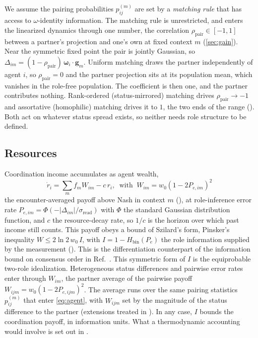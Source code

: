 \documentclass[
  aps,prx,
  reprint,
  superscriptaddress,
  nofootinbib,
  longbibliography
]{revtex4-2}
\newcommand{\w}{\bm{\omega}}
\newcommand{\g}{\mathbf{g}}
\newcommand{\rhopair}{\rho_{\mathrm{pair}}}
\newcommand{\sread}{\sigma_{\mathrm{read}}}
\newcommand{\smref}[1]{\cite[Sec.~#1]{SM}}
\newcommand{\smeq}[1]{\cite[Eq.~(#1)]{SM}}
\begin{document}
We assume the pairing probabilities $p^{(m)}_{ij}$ are set by a \emph{matching rule} that has access to $\omega$-identity information. The matching rule is unrestricted, and enters the linearized dynamics through one number, the correlation $\rhopair\in[-1,1]$ between a partner's projection and one's own at fixed context $m$ (\cref{sec:gain}). Near the symmetric fixed point the pair is jointly Gaussian, so $\Delta_{im}=(1-\rhopair)\,\w_i\cdot\g_m$. Uniform matching draws the partner independently of agent $i$, so $\rhopair=0$ and the partner projection sits at its population mean, which vanishes in the role-free population. The coefficient is then one, and the partner contributes nothing. Rank-ordered (status-mirrored) matching drives $\rhopair\to-1$ and assortative (homophilic) matching drives it to $1$, the two ends of the range (\smref{S2\,B}). Both act on whatever status spread exists, so neither needs role structure to be defined.

\subsection{Resources}
\noindent Coordination income accumulates as agent wealth,
\begin{equation}
\dot r_i = \sum_m f_m W_{im} - c\,r_i, \;\;\textrm{with} \;\;W_{im}=w_0(1-2P_{e,im})^2
\label{eq:resource}
\end{equation}
the encounter-averaged payoff above Nash in context $m$ (\smeq{S2}), at role-inference error rate $P_{e,im}=\Phi(-|\Delta_{im}|/\sread)$ with $\Phi$ the standard Gaussian distribution function, and $c$ the resource-decay rate, so $1/c$ is the horizon over which past income still counts. This payoff obeys a bound of Szilard's form, Pinsker's inequality $W\le 2\ln2\,w_0\,I$, with $I=1-H_{\mathrm{bin}}(P_e)$ the role information supplied by the measurement (\smref{S1}). This is the differentiation counterpart of the information bound on consensus order in Ref.~\cite{vansaders2023}. This symmetric form of $I$ is the equiprobable two-role idealization. Heterogeneous status differences and pairwise error rates enter through $W_{im}$, the partner average of the pairwise payoff $W_{ijm}=w_0(1-2P_{e,ijm})^2$. The average runs over the same pairing statistics $p^{(m)}_{ij}$ that enter \cref{eq:agent}, with $W_{ijm}$ set by the magnitude of the status difference to the partner (extensions treated in \smref{S2}). In any case, $I$ bounds the coordination payoff, in information units. What a thermodynamic accounting would involve is set out in \smref{S9}.
\end{document}
